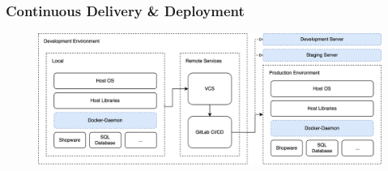 
\subsubsection{Continuous Delivery \& Deployment}

\begin{figure}[H]
    \centering
    \includegraphics[width=\textwidth]{images/content/ci-architecture-concept}
    \label{fig:ci-architecture-concept}
\end{figure}

\clearpage
